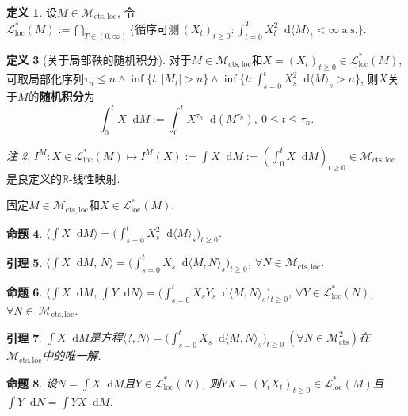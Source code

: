 \documentclass{ctexart}
\theoremstyle{definition}
\newtheorem{Def}{定义}[section]
\theoremstyle{remark}
\newtheorem{Rmk}[Def]{注}
\theoremstyle{plain}
\newtheorem{Prop}[Def]{命题}
\newtheorem{Lem}[Def]{引理}
\newcommand{\1}{\mathbbm{1}}				%
\newcommand{\as}{\mathrm{a.s.}}				%
\newcommand{\agp}[1]{\langle #1 \rangle}	%
\newcommand{\abs}[1]{\lvert#1\rvert}			%
\newcommand{\R}{\mathbb{R}}					%
\newcommand{\tint}{\textstyle\int\nolimits}
\renewcommand*{\d}{\mathop{}\!\mathrm{d}}	%
\begin{document}
\begin{Def}
设$M \in \mathcal{M}_{\mathrm{cts},\mathrm{loc}}$, 令$\mathcal{L}_{\mathrm{loc}}^{*}(M) := \bigcap_{T \in (0,\infty)}\{ \text{循序可测}\,(X_{t})_{t \ge 0} : \tint_{t=0}^{T} X_{t}^{2} \d\agp{M}_{t} < \infty ~\as \}$.
\end{Def}
\begin{Def}[关于局部鞅的随机积分]
对于$M \in \mathcal{M}_{\mathrm{cts},\mathrm{loc}}$和$X = (X_{t})_{t \ge 0} \in \mathcal{L}_{\mathrm{loc}}^{*}(M)$, 可取局部化序列$\tau_{n} \le n \wedge \inf\{ t : \abs{M_{t}} > n \} \wedge \inf\{ t : \tint_{s=0}^{t} X_{s}^{2} \d\agp{M}_{s} > n \}$, 则$X$关于$M$的\textbf{随机积分}为
\[ \tint_{0}^{t} X \d M := \tint_{0}^{t} X^{\tau_{n}} \d(M^{\tau_{n}}) ,\ 0 \le t \le \tau_{n} . \]
\begin{Rmk}
$I^{M} : X \in \mathcal{L}_{\mathrm{loc}}^{*}(M) \mapsto I^{M}(X) := \tint X \d M := (\tint_{0}^{t} X \d M)_{t \ge 0} \in \mathcal{M}_{\mathrm{cts},\mathrm{loc}}$是良定义的$\R$-线性映射.
\end{Rmk}
\end{Def}

\PointingHand 固定$M \in \mathcal{M}_{\mathrm{cts},\mathrm{loc}}$和$X \in \mathcal{L}_{\mathrm{loc}}^{*}(M)$.

\begin{Prop}
$\agp{\int X \d M} = \big(\tint_{s=0}^{t} X_{s}^{2} \d\agp{M}_{s} \big)_{t \ge 0}$.
\end{Prop}

\begin{Lem}
$\agp{\int X \d M ,\, N} = \big(\tint_{s=0}^{t} X_{s} \d\agp{M,N}_{s} \big)_{t \ge 0}$, $\forall N \in \mathcal{M}_{\mathrm{cts},\mathrm{loc}}$.
\end{Lem}

\begin{Prop}
$\agp{\int X \d M ,\, \int Y \d N} = \big(\tint_{s=0}^{t} X_{s}Y_{s} \d\agp{M,N}_{s} \big)_{t \ge 0}$, $\forall Y \in \mathcal{L}_{\mathrm{loc}}^{*}(N)$, $\forall N \in~\!\!\mathcal{M}_{\mathrm{cts},\mathrm{loc}}$.
\end{Prop}

\begin{Lem}
$\int X \d M$是方程$\agp{?,N} = \big(\tint_{s=0}^{t} X_{s} \d\agp{M,N}_{s} \big)_{t \ge 0} \ (\forall N \in \mathcal{M}^{2}_{\mathrm{cts}})$在$\mathcal{M}_{\mathrm{cts},\mathrm{loc}}$中的唯一解.
\end{Lem}

\begin{Prop}
设$N = \int X \d M$且$Y \in \mathcal{L}_{\mathrm{loc}}^{*}(N)$, 则$YX = (Y_{t}X_{t})_{t \ge 0} \in \mathcal{L}_{\mathrm{loc}}^{*}(M)$且$\int Y \d N = \int YX \d M$.
\end{Prop}
\end{document}
